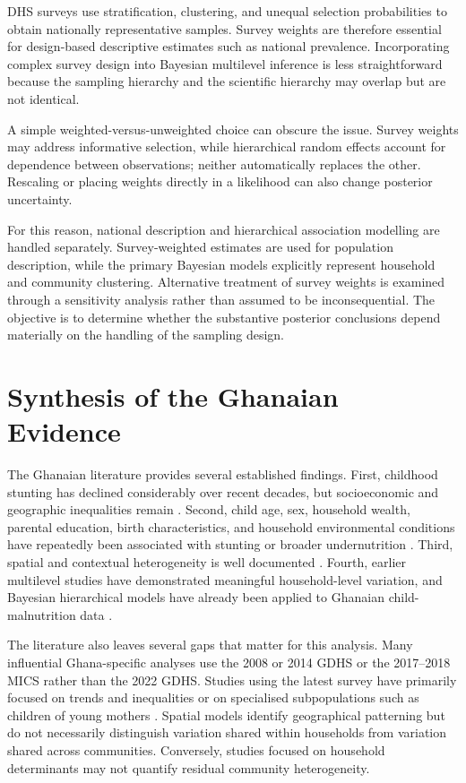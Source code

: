 DHS surveys use stratification, clustering, and unequal selection probabilities to obtain nationally representative samples. Survey weights are therefore essential for design-based descriptive estimates such as national prevalence. Incorporating complex survey design into Bayesian multilevel inference is less straightforward because the sampling hierarchy and the scientific hierarchy may overlap but are not identical.

A simple weighted-versus-unweighted choice can obscure the issue. Survey weights may address informative selection, while hierarchical random effects account for dependence between observations; neither automatically replaces the other. Rescaling or placing weights directly in a likelihood can also change posterior uncertainty.

For this reason, national description and hierarchical association modelling are handled separately. Survey-weighted estimates are used for population description, while the primary Bayesian models explicitly represent household and community clustering. Alternative treatment of survey weights is examined through a sensitivity analysis rather than assumed to be inconsequential. The objective is to determine whether the substantive posterior conclusions depend materially on the handling of the sampling design.

\section{Synthesis of the Ghanaian Evidence}

The Ghanaian literature provides several established findings. First, childhood stunting has declined considerably over recent decades, but socioeconomic and geographic inequalities remain \cite{GSSICF2024,OsborneEtAl2025}. Second, child age, sex, household wealth, parental education, birth characteristics, and household environmental conditions have repeatedly been associated with stunting or broader undernutrition \cite{DartehEtAl2014,AhetoEtAl2015,BoahEtAl2019,SeworJayalakshmi2024}. Third, spatial and contextual heterogeneity is well documented \cite{AhetoDagne2021,AmoakoJohnson2022}. Fourth, earlier multilevel studies have demonstrated meaningful household-level variation, and Bayesian hierarchical models have already been applied to Ghanaian child-malnutrition data \cite{AhetoEtAl2015,IddrisuGyabaah2023}.

The literature also leaves several gaps that matter for this analysis. Many influential Ghana-specific analyses use the 2008 or 2014 GDHS or the 2017--2018 MICS rather than the 2022 GDHS. Studies using the latest survey have primarily focused on trends and inequalities or on specialised subpopulations such as children of young mothers \cite{OsborneEtAl2025,OgumEtAl2026}. Spatial models identify geographical patterning but do not necessarily distinguish variation shared within households from variation shared across communities. Conversely, studies focused on household determinants may not quantify residual community heterogeneity.

